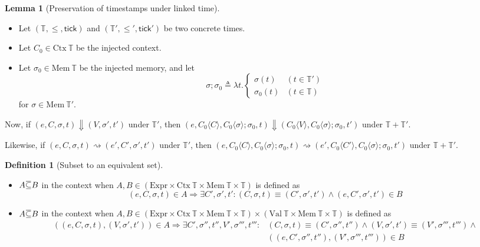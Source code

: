 \documentclass{article}
\theoremstyle{definition}
\newtheorem{definition}{Definition}[section]
\newtheorem{lem}{Lemma}[section]
\newcommand{\loverbar}[1]{\mkern 1.5mu\overline{\mkern-1.5mu#1\mkern-1.5mu}\mkern 1.5mu}
\newcommand*{\Expr}{\text{Expr}}
\newcommand*{\Time}{\mathbb{T}}
\newcommand*{\Ctx}[1]{\text{Ctx}\:{#1}}
\newcommand*{\Value}[1]{\text{Val}\:{#1}}
\newcommand*{\Mem}[1]{\text{Mem}\:{#1}}
\newcommand*{\tick}{\mathsf{tick}}
\newcommand*{\inject}[2]{{#1}\langle{#2}\rangle}
\begin{document}
\begin{lem}[Preservation of timestamps under linked time]
  $\:$

  \begin{itemize}
    \item Let $(\Time,\le,\tick)$ and $(\Time',\le',\tick')$ be two concrete times.
    \item Let $C_{0}\in\Ctx{\Time}$ be the injected context.
    \item Let $\sigma_{0}\in\Mem{\Time}$ be the injected memory, and let
          \[
            \sigma;\sigma_{0}\triangleq\lambda t.
            \begin{cases}
              \sigma(t)     & (t\in\Time') \\
              \sigma_{0}(t) & (t\in\Time)
            \end{cases}
          \]
          for $\sigma\in\Mem{\Time'}$.
  \end{itemize}

  Now, if $(e,C,\sigma,t)\Downarrow(V,\sigma',t')$ under $\Time'$, then
  $(e,\inject{C_0}{C},\inject{C_0}{\sigma};\sigma_{0},t)\Downarrow(\inject{C_0}{V},\inject{C_0}{\sigma};\sigma_0,t')$ under $\Time+\Time'$.

  Likewise, if $(e,C,\sigma,t)\rightsquigarrow(e',C',\sigma',t')$ under $\Time'$, then
  $(e,\inject{C_0}{C},\inject{C_0}{\sigma};\sigma_{0},t)\rightsquigarrow(e',\inject{C_0}{C'},\inject{C_0}{\sigma};\sigma_0,t')$ under $\Time+\Time'$.
\end{lem}

\begin{definition}[Subset to an equivalent set]
  $\:$

  \begin{itemize}
    \item $A\loverbar{\subseteq}B$ in the context when $A,B\in(\Expr\times\Ctx{\Time}\times\Mem{\Time}\times\Time)$ is defined as
          \[
            (e,C,\sigma,t)\in A\Rightarrow \exists C',\sigma',t' : (C,\sigma,t)\equiv(C',\sigma',t')\wedge(e,C',\sigma',t')\in B
          \]
    \item $A\loverbar{\subseteq}B$ in the context when $A,B\in(\Expr\times\Ctx{\Time}\times\Mem{\Time}\times\Time)\times(\Value{\Time}\times\Mem{\Time}\times\Time)$ is defined as
          \begin{align*}
            ((e,C,\sigma,t),(V,\sigma',t'))\in A\Rightarrow \exists C',\sigma'',t'',V',\sigma''',t''' : & (C,\sigma,t)\equiv(C',\sigma'',t'')\wedge(V,\sigma',t')\equiv(V',\sigma''',t''')\wedge \\
                                                                                                        & ((e,C',\sigma'',t''),(V',\sigma''',t'''))\in B
          \end{align*}
  \end{itemize}
\end{definition}
\end{document}
